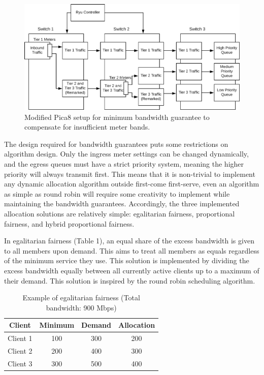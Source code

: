 \documentclass[accepted,single]{gipaper}
\begin{document}
\begin{figure}
	\centering
	\includegraphics[width=6in]{figs/dbaFrame2.png}
	\caption{ Modified Pica8 setup for minimum bandwidth guarantee to compensate for insufficient meter bands. } \label{dbaDiag2}
\end{figure}

The design required for bandwidth guarantees puts some restrictions on algorithm design. Only the ingress meter settings can be changed dynamically, and the egress queues must have a strict priority system, meaning the higher priority will always transmit first. This means that it is non-trivial to implement any dynamic allocation algorithm outside first-come first-serve, even an algorithm as simple as round robin will require some creativity to implement while maintaining the bandwidth guarantees. Accordingly, the three implemented allocation solutions are relatively simple: egalitarian fairness, proportional fairness, and hybrid proportional fairness.

In egalitarian fairness (Table 1), an equal share of the excess bandwidth is given to all members upon demand. This aims to treat all members as equals regardless of the minimum service they use. This solution is implemented by dividing the excess bandwidth equally between all currently active clients up to a maximum of their demand. This solution is inspired by the round robin scheduling algorithm.

\begin{table}[htpb]
	\label{egalitarian_table}
	\vspace{-3mm}
	\begin{center}
		\begin{small}
			\begin{tabular}{cccc}
				Client & Minimum & Demand & Allocation \\
				\hline
				Client 1 & 100 & 300 & 200 \\
				Client 2 & 200 & 400 & 300 \\
				Client 3 & 300 & 500 & 400 \\
			\end{tabular}
		\end{small}
	\end{center}
	\caption{Example of egalitarian fairness (Total bandwidth: 900 Mbps)}
	\vspace{-3mm}
\end{table}
\end{document}
